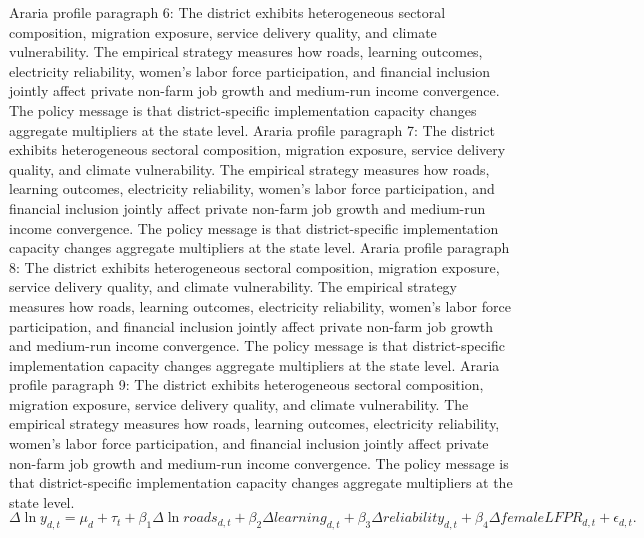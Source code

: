 \documentclass[preprint,12pt]{elsarticle}
\begin{document}
Araria profile paragraph 6: The district exhibits heterogeneous sectoral composition, migration exposure, service delivery quality, and climate vulnerability. The empirical strategy measures how roads, learning outcomes, electricity reliability, women's labor force participation, and financial inclusion jointly affect private non-farm job growth and medium-run income convergence. The policy message is that district-specific implementation capacity changes aggregate multipliers at the state level.
Araria profile paragraph 7: The district exhibits heterogeneous sectoral composition, migration exposure, service delivery quality, and climate vulnerability. The empirical strategy measures how roads, learning outcomes, electricity reliability, women's labor force participation, and financial inclusion jointly affect private non-farm job growth and medium-run income convergence. The policy message is that district-specific implementation capacity changes aggregate multipliers at the state level.
Araria profile paragraph 8: The district exhibits heterogeneous sectoral composition, migration exposure, service delivery quality, and climate vulnerability. The empirical strategy measures how roads, learning outcomes, electricity reliability, women's labor force participation, and financial inclusion jointly affect private non-farm job growth and medium-run income convergence. The policy message is that district-specific implementation capacity changes aggregate multipliers at the state level.
Araria profile paragraph 9: The district exhibits heterogeneous sectoral composition, migration exposure, service delivery quality, and climate vulnerability. The empirical strategy measures how roads, learning outcomes, electricity reliability, women's labor force participation, and financial inclusion jointly affect private non-farm job growth and medium-run income convergence. The policy message is that district-specific implementation capacity changes aggregate multipliers at the state level.
\begin{equation}\Delta \ln y_{d,t}=\mu_d+\tau_t+\beta_1\Delta\ln roads_{d,t}+\beta_2\Delta learning_{d,t}+\beta_3\Delta reliability_{d,t}+\beta_4\Delta femaleLFPR_{d,t}+\epsilon_{d,t}.\end{equation}
\end{document}
